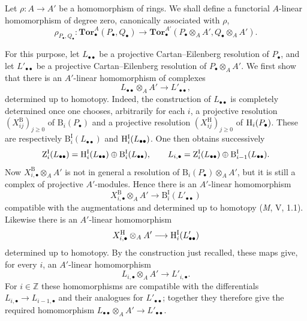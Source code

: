 \begin{env}[6.3.8]
\label{III.6.3.8}
Let $\rho:A\longrightarrow A'$ be a homomorphism of rings.  We
shall define a functorial $A$-linear homomorphism of degree zero,
canonically associated with $\rho$,
\[
  \rho_{P_\bullet,Q_\bullet}:
  \mathbf{Tor}_\bullet^A(P_\bullet,Q_\bullet)
  \longrightarrow
  \mathbf{Tor}_\bullet^{A'}
  (P_\bullet\otimes_AA',Q_\bullet\otimes_AA').
  \tag{6.3.8.1}\label{III.6.3.8.1}
\]

For this purpose, let $L_{\bullet\bullet}$ be a projective
Cartan--Eilenberg resolution of $P_\bullet$, and let
$L'_{\bullet\bullet}$ be a projective Cartan--Eilenberg resolution
of $P_\bullet\otimes_AA'$.  We first show that there is an
$A'$-linear homomorphism of complexes
\[
  L_{\bullet\bullet}\otimes_AA'
  \longrightarrow L'_{\bullet\bullet},
\]
determined up to homotopy.  Indeed, the construction of
$L_{\bullet\bullet}$ is completely determined once one chooses,
arbitrarily for each $i$, a projective resolution
$(X_{ij}^{\mathrm B})_{j\geq0}$ of $\mathrm B_i(P_\bullet)$ and a
projective resolution $(X_{ij}^{\mathrm H})_{j\geq0}$ of
$\mathrm H_i(P_\bullet)$.  These are respectively
$\mathrm B_i^{\mathrm I}(L_{\bullet\bullet})$ and
$\mathrm H_i^{\mathrm I}(L_{\bullet\bullet})$.  One then obtains
successively
\[
  \mathrm Z_i^{\mathrm I}(L_{\bullet\bullet})
  =
  \mathrm H_i^{\mathrm I}(L_{\bullet\bullet})
  \oplus
  \mathrm B_i^{\mathrm I}(L_{\bullet\bullet}),
  \qquad
  L_{i,\bullet}
  =
  \mathrm Z_i^{\mathrm I}(L_{\bullet\bullet})
  \oplus
  \mathrm B_{i-1}^{\mathrm I}(L_{\bullet\bullet}).
\]
Now $X_{i,\bullet}^{\mathrm B}\otimes_AA'$ is not in general a
resolution of $\mathrm B_i(P_\bullet)\otimes_AA'$, but it is still
a complex of projective $A'$-modules.  Hence there is an
$A'$-linear homomorphism
\[
  X_{i,\bullet}^{\mathrm B}\otimes_AA'
  \longrightarrow
  \mathrm B_i^{\mathrm I}(L'_{\bullet\bullet})
\]
compatible with the augmentations and determined up to homotopy
(\emph{M}, V, 1.1).  Likewise there is an $A'$-linear homomorphism
\[
  X_{i,\bullet}^{\mathrm H}\otimes_AA'
  \longrightarrow
  \mathrm H_i^{\mathrm I}(L'_{\bullet\bullet})
\]
determined up to homotopy.  By the construction just recalled,
these maps give, for every $i$, an $A'$-linear homomorphism
\[
  L_{i,\bullet}\otimes_AA'\longrightarrow L'_{i,\bullet}.
\]
For $i\in\mathbb Z$ these homomorphisms are compatible with the
differentials $L_{i,\bullet}\longrightarrow L_{i-1,\bullet}$ and
their analogues for $L'_{\bullet\bullet}$; together they therefore
give the required homomorphism
$L_{\bullet\bullet}\otimes_AA'\longrightarrow L'_{\bullet\bullet}$.


\end{env}
